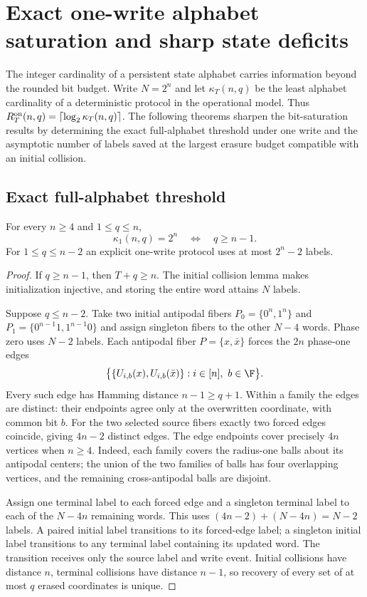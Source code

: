 \section{Exact one-write alphabet saturation and sharp state deficits}\label{sec:v3alphabet}

The integer cardinality of a persistent state alphabet carries information beyond the rounded bit budget. Write $N=2^n$ and let $\kappa_T(n,q)$ be the least alphabet cardinality of a deterministic protocol in the operational model. Thus $R_T^{\rm on}(n,q)=\lceil\log_2\kappa_T(n,q)\rceil$. The following theorems sharpen the bit-saturation results by determining the exact full-alphabet threshold under one write and the asymptotic number of labels saved at the largest erasure budget compatible with an initial collision.

\subsection{Exact full-alphabet threshold}

\begin{theorem}\label{thm:v3threshold}
For every $n\ge4$ and $1\le q\le n$,
\[
 \boxed{\ \kappa_1(n,q)=2^n\quad\Longleftrightarrow\quad q\ge n-1.\ }
\]
For $1\le q\le n-2$ an explicit one-write protocol uses at most $2^n-2$ labels.
\end{theorem}
\begin{proof}
If $q\ge n-1$, then $T+q\ge n$. The initial collision lemma makes initialization injective, and storing the entire word attains $N$ labels.

Suppose $q\le n-2$. Take two initial antipodal fibers $P_0=\{0^n,1^n\}$ and $P_1=\{0^{n-1}1,1^{n-1}0\}$ and assign singleton fibers to the other $N-4$ words. Phase zero uses $N-2$ labels. Each antipodal fiber $P=\{x,\bar x\}$ forces the $2n$ phase-one edges
\[
 \bigl\{\{U_{i,b}(x),U_{i,b}(\bar x)\}:i\in[n],\ b\in\F\bigr\}.
\]
Every such edge has Hamming distance $n-1\ge q+1$. Within a family the edges are distinct: their endpoints agree only at the overwritten coordinate, with common bit $b$. For the two selected source fibers exactly two forced edges coincide, giving $4n-2$ distinct edges. The edge endpoints cover precisely $4n$ vertices when $n\ge4$. Indeed, each family covers the radius-one balls about its antipodal centers; the union of the two families of balls has four overlapping vertices, and the remaining cross-antipodal balls are disjoint.

Assign one terminal label to each forced edge and a singleton terminal label to each of the $N-4n$ remaining words. This uses $(4n-2)+(N-4n)=N-2$ labels. A paired initial label transitions to its forced-edge label; a singleton initial label transitions to any terminal label containing its updated word. The transition receives only the source label and write event. Initial collisions have distance $n$, terminal collisions have distance $n-1$, so recovery of every set of at most $q$ erased coordinates is unique.
\end{proof}


